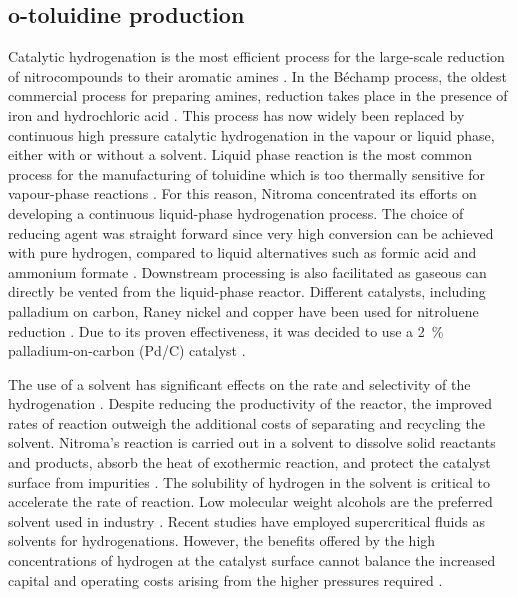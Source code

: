 \subsection{o-toluidine production}

Catalytic hydrogenation is the most efficient process for the large-scale reduction of nitrocompounds to their aromatic amines \cite{cartolano_amines_2004}. In the Béchamp process, the oldest commercial process for preparing amines, reduction takes place in the presence of iron and hydrochloric acid \cite{bowers_toluidines_2000}. This process has now widely been replaced by continuous high pressure catalytic hydrogenation in the vapour or liquid phase, either with or without a solvent. Liquid phase reaction is the most common process for the manufacturing of toluidine which is too thermally sensitive for vapour-phase reactions \cite{cartolano_amines_2004}. For this reason, Nitroma concentrated its efforts on developing a continuous liquid-phase hydrogenation process. The choice of reducing agent was straight forward since very high conversion can be achieved with pure hydrogen, compared to liquid alternatives such as formic acid and ammonium formate \cite{gowda_catalytic_2000}. Downstream processing is also facilitated as gaseous  can directly be vented from the liquid-phase reactor. Different catalysts, including palladium on carbon, Raney nickel and copper have been used for nitroluene reduction \cite{zhao_new_2016}. Due to its proven effectiveness, it was decided to use a \SI{2}{\percent\ww} palladium-on-carbon (Pd/C) catalyst  \cite{rajadhyaksha_solvent_1986}. 

The use of a solvent has significant effects on the rate and selectivity of the hydrogenation \cite{bowers_toluidines_2000}. Despite reducing the productivity of the reactor, the improved rates of reaction outweigh the additional costs of separating and recycling the solvent. Nitroma's reaction is carried out in a solvent to dissolve solid reactants and products, absorb the heat of exothermic reaction, and protect the catalyst surface from impurities \cite{yao_kinetics_1959}. The solubility of hydrogen in the solvent is critical to accelerate the rate of reaction. Low molecular weight alcohols are the preferred solvent used in industry \cite{cartolano_amines_2004}. Recent studies have employed supercritical fluids as solvents for hydrogenations. However, the benefits offered by the high concentrations of hydrogen at the catalyst surface cannot balance the increased capital and operating costs arising from the higher pressures required \cite{bowers_toluidines_2000}. 

